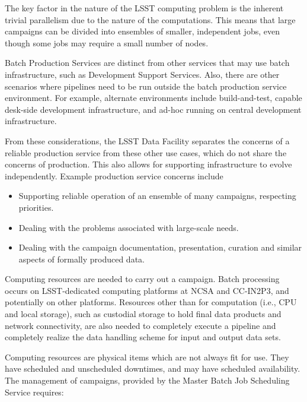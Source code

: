 The key factor in the nature of the LSST computing problem is the inherent 
trivial parallelism due to the nature of the computations. This means that large 
campaigns can be divided into ensembles of smaller, independent jobs, even 
though some jobs may require a small number of nodes.

Batch Production Services are distinct from other services that may use batch 
infrastructure, such as Development Support Services. Also, there are other 
scenarios where pipelines need to be run outside the batch production service 
environment.  For example, alternate environments include build-and-test, 
capable desk-side development infrastructure, and ad-hoc running on central 
development infrastructure.  

From these considerations, the LSST Data Facility separates the concerns of a 
reliable production service from these other use cases, which do not share the 
concerns of production. This also allows for supporting infrastructure to evolve 
independently. Example production service concerns include

\begin{itemize}

\item Supporting reliable operation of an ensemble of many campaigns, respecting 
priorities. 

\item Dealing with the problems associated with large-scale needs.

\item Dealing with the campaign documentation, presentation, curation and similar 
aspects of formally produced data.

\end{itemize}

Computing resources are needed to carry out a campaign. Batch processing occurs 
on LSST-dedicated computing platforms at NCSA and CC-IN2P3, and potentially on 
other platforms. Resources other than for computation (i.e., CPU and local 
storage), such as custodial storage to hold final data products and network 
connectivity, are also needed to completely execute a pipeline and completely 
realize the data handling scheme for input and output data sets.   
 
Computing resources are physical items which are not always fit for use. They 
have scheduled and unscheduled downtimes, and may have scheduled availability. 
The management of campaigns, provided by the Master Batch Job Scheduling Service 
requires:

